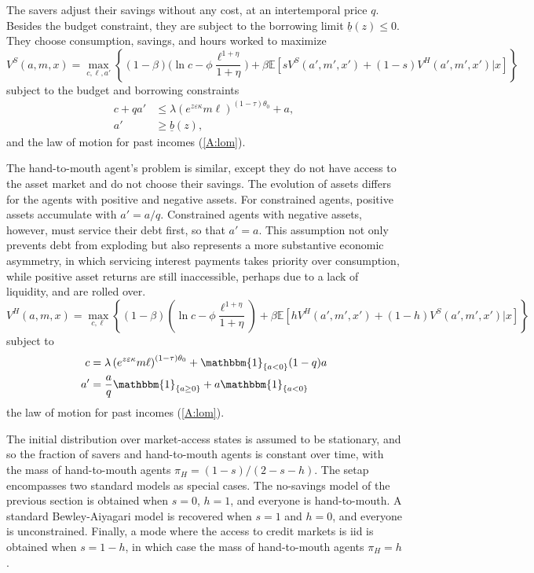 The savers adjust their savings without any cost, at an intertemporal price $q$. Besides the budget constraint, they are subject to the borrowing limit $\underline{b}(z)\leq 0$. They choose consumption, savings, and hours worked to maximize
\[
V^S(a,m,x) = \max_{c,\ell,a'} \left\{ (1-\beta) \big(\ln c- \phi \frac { \ell^{1+\eta}}{1+\eta}  \big) +\beta  \mathbb{E} \left[ s V^S(a',m', x') +(1-s)V^H(a',m', x') | x \right] \right\}
\]
subject to the budget and borrowing constraints
\begin{align}
c +q a' &\leq \lambda \left( e^{z\varepsilon \kappa} m \ell  \right) ^{(1-\tau)\theta_0} +a, \label{A:bc} \\
a' &\geq \underline{b}(z),\label{A:boc}
\end{align}
and the law of motion for past incomes  (\ref{A:lom}). 

The hand-to-mouth agent's problem is similar, except they do not have access to the asset market and do not choose their savings. The evolution of assets differs for the agents with positive and negative assets. For constrained agents, positive assets accumulate with $a'=a/q$. Constrained agents with negative assets, however, must service their debt first, so that $a'=a$. This assumption not only prevents debt from exploding but also represents a more substantive economic asymmetry, in which servicing interest payments takes priority over consumption, while positive asset returns are still inaccessible, perhaps due to a lack of liquidity, and are rolled over.
\[
V^H(a,m, x) = \max_{c,\ell} \left\{ (1-\beta) \left(\ln c- \phi \frac {\ell^{1+\eta} }{1+\eta}  \right) +\beta  \mathbb{E} \left[ h V^H(a',m', x') +(1-h) V^S(a',m', x') | x \right] \right\}
\]
subject to
\begin{align*}
	c  &=\lambda \left( e^{z\varepsilon \kappa}  m \ell\right) ^{(1-\tau)\theta_0} + \mathbbm{1}_{\{a<0\}}(1-q)a \\
	a' &=\frac{a}{q}\mathbbm{1}_{\{a\geq0\}} + a\mathbbm{1}_{\{a<0\}}
\end{align*}
the law of motion for past incomes  (\ref{A:lom}).

The initial distribution over market-access states is assumed to be stationary, and so the fraction of savers and hand-to-mouth agents is constant over time, with the mass of hand-to-mouth agents $\pi_{H}=(1-s)/(2-s-h)$. The setap encompasses two standard models as special cases. The no-savings model of the previous section is obtained when $s=0$, $h=1$, and everyone is hand-to-mouth. A standard Bewley-Aiyagari model is recovered when $s=1$ and $h=0$, and everyone is unconstrained. Finally, a mode where the access to credit markets is iid is obtained when $s=1-h$, in which case the mass of hand-to-mouth agents $\pi_{H}=h$.

